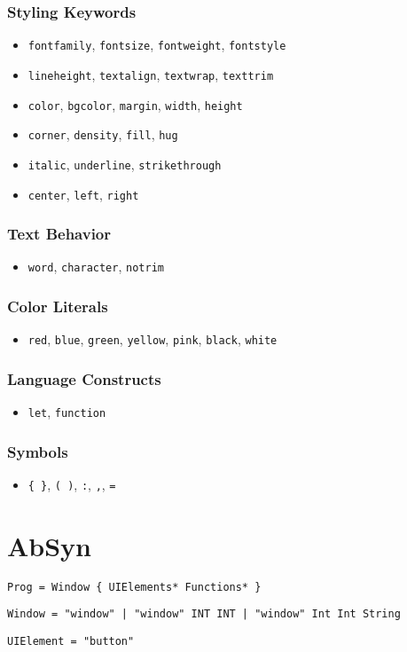 \documentclass{article}
\begin{document}
\subsubsection*{Styling Keywords}
\begin{itemize}
    \item \texttt{fontfamily}, \texttt{fontsize}, \texttt{fontweight}, \texttt{fontstyle}
    \item \texttt{lineheight}, \texttt{textalign}, \texttt{textwrap}, \texttt{texttrim}
    \item \texttt{color}, \texttt{bgcolor}, \texttt{margin}, \texttt{width}, \texttt{height}
    \item \texttt{corner}, \texttt{density}, \texttt{fill}, \texttt{hug}
    \item \texttt{italic}, \texttt{underline}, \texttt{strikethrough}
    \item \texttt{center}, \texttt{left}, \texttt{right}
\end{itemize}

\subsubsection*{Text Behavior}
\begin{itemize}
    \item \texttt{word}, \texttt{character}, \texttt{notrim}
\end{itemize}

\subsubsection*{Color Literals}
\begin{itemize}
    \item \texttt{red}, \texttt{blue}, \texttt{green}, \texttt{yellow}, \texttt{pink}, \texttt{black}, \texttt{white}
\end{itemize}

\subsubsection*{Language Constructs}
\begin{itemize}
    \item \texttt{let}, \texttt{function}
\end{itemize}

\subsubsection*{Symbols}
\begin{itemize}
    \item \texttt{\{ \}}, \texttt{( )}, \texttt{:}, \texttt{,}, \texttt{=}
\end{itemize}

\section{AbSyn}
\begin{verbatim}
Prog = Window { UIElements* Functions* }
\end{verbatim}

\begin{verbatim}
Window = "window" | "window" INT INT | "window" Int Int String
\end{verbatim}

\begin{verbatim}
UIElement = "button"
\end{verbatim}
\end{document}
